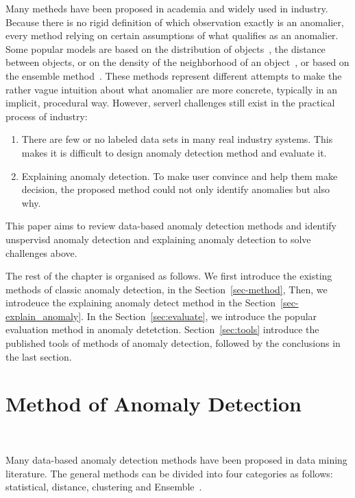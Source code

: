 Many metheds have been proposed in academia and
widely used in industry.
Because there is no rigid definition of which
observation exactly is an anomalier,
every method relying on certain assumptions of
what qualifies as an anomalier.
Some popular models are based on
the distribution of
objects~\cite{siripanadorn2010anomaly,chandola2009anomaly,kromanis2013support},
the distance~\cite{knorr1997unified}
between objects,
or on the density of
the neighborhood of
an object~\cite{agyemang2004algorithm,breunig2000lof,papadimitriou2003loci},
or based on the ensemble method~\cite{zhou2012ensemble}.
These methods represent different attempts to make
the rather vague intuition about
what anomalier are more concrete,
typically in an implicit,
procedural way.
However,
serverl challenges still exist
in the practical  process of industry:
\begin{enumerate}
    \item There are few or no labeled data sets in
    many real industry systems.
    This makes it is difficult to design anomaly detection method and evaluate it. 
    \item Explaining anomaly detection.
    To make  user convince and help them make decision,
    the proposed method could not only identify anomalies but also
    why.
\end{enumerate}
This paper aims to review data-based anomaly detection methods and
identify unspervisd anomaly detection and explaining anomaly detection
to solve challenges above.

The rest of the chapter is organised as follows.
We first introduce the existing methods of classic anomaly detection,
in the Section~\ref{sec-method},
Then,
we introdeuce the explaining anomaly detect method
in the Section~\ref{sec-explain_anomaly}.
In the Section~\ref{sec:evaluate},
we introduce the popular evaluation method in anomaly detetction.
Section~\ref{sec:tools} introduce the published tools of
methods of anomaly detection,
followed by the conclusions in the last section.

\section{Method of Anomaly Detection}~\label{sec-method}

Many data-based anomaly detection methods have been proposed in
data mining literature.
The general methods can be divided into four categories as follows:
statistical,
distance,
clustering and Ensemble~\cite{cook2019anomaly}.

